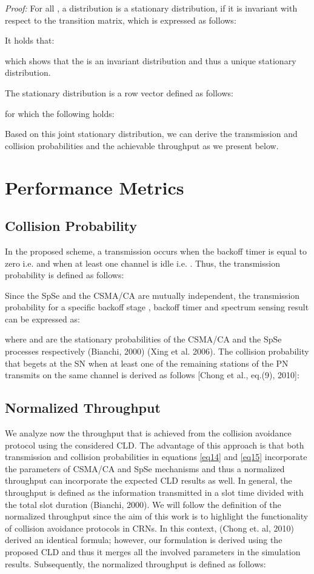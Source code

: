 \documentclass
[journal,11pt,draftclsnofoot,onecolumn,doublespace]{tETN2e}
\begin{document}
\textit{Proof:}  For all , a distribution  is a stationary distribution, if it is invariant with respect to the transition matrix, which is expressed as follows:

It holds that:

which shows that the  is an invariant distribution and thus a unique stationary distribution. 

The stationary distribution  is a row vector defined as follows: 

for which the following holds:

Based on this joint stationary distribution, we can derive the transmission and collision probabilities and the achievable throughput as we present below.

\section{Performance Metrics}

\subsection{Collision Probability}

In the proposed scheme, a transmission occurs when the backoff timer is equal to zero i.e.  and when at least one channel is idle i.e. . Thus, the transmission probability is defined as follows: 

Since the SpSe and the CSMA/CA are mutually independent, the transmission
probability for a specific backoff stage , backoff timer  and spectrum sensing result  can be expressed as: 

where  and  are the stationary probabilities of the CSMA/CA and the SpSe processes respectively (Bianchi, 2000) (Xing et al. 2006). The collision probability  that begets at the SN when at least one of the  remaining stations of the PN transmits on the same channel is derived as follows [Chong et al., eq.(9), 2010]: 


\subsection{Normalized Throughput}

We analyze now the throughput that is achieved from the collision avoidance protocol using the considered CLD. The advantage of this approach is that both transmission and collision probabilities in equations \eqref{eq14} and \eqref{eq15} incorporate the parameters of CSMA/CA and SpSe mechanisms and thus a normalized throughput can incorporate the expected CLD results as well. In general, the throughput is defined as the information transmitted in a slot time divided with the total slot duration (Bianchi, 2000). We will follow the definition of the normalized throughput since the aim of this work is to highlight the functionality of collision avoidance protocols in CRNs. In this context, (Chong et. al, 2010) derived an identical formula; however, our formulation is derived using the proposed CLD and thus it merges all the involved parameters in the simulation results. Subsequently, the normalized throughput is defined as follows: 
\end{document}
